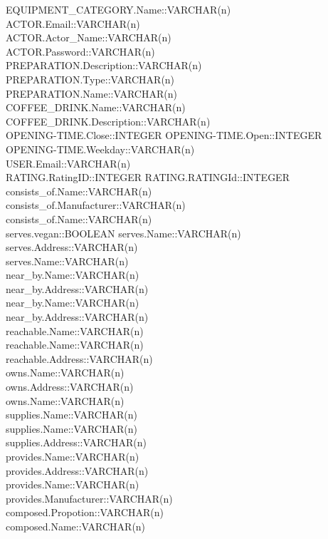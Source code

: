 EQUIPMENT\_CATEGORY.Name::VARCHAR(n)\\
ACTOR.Email::VARCHAR(n)\\
ACTOR.Actor\_Name::VARCHAR(n)\\
ACTOR.Password::VARCHAR(n)\\
PREPARATION.Description::VARCHAR(n)\\
PREPARATION.Type::VARCHAR(n)\\
PREPARATION.Name::VARCHAR(n)\\
COFFEE\_DRINK.Name::VARCHAR(n)\\
COFFEE\_DRINK.Description::VARCHAR(n)\\
OPENING-TIME.Close::INTEGER
OPENING-TIME.Open::INTEGER
OPENING-TIME.Weekday::VARCHAR(n)\\
USER.Email::VARCHAR(n)\\
RATING.RatingID::INTEGER
RATING.RATINGId::INTEGER
consists\_of.Name::VARCHAR(n)\\
consists\_of.Manufacturer::VARCHAR(n)\\
consists\_of.Name::VARCHAR(n)\\
serves.vegan::BOOLEAN
serves.Name::VARCHAR(n)\\
serves.Address::VARCHAR(n)\\
serves.Name::VARCHAR(n)\\
near\_by.Name::VARCHAR(n)\\
near\_by.Address::VARCHAR(n)\\
near\_by.Name::VARCHAR(n)\\
near\_by.Address::VARCHAR(n)\\
reachable.Name::VARCHAR(n)\\
reachable.Name::VARCHAR(n)\\
reachable.Address::VARCHAR(n)\\
owns.Name::VARCHAR(n)\\
owns.Address::VARCHAR(n)\\
owns.Name::VARCHAR(n)\\
supplies.Name::VARCHAR(n)\\
supplies.Name::VARCHAR(n)\\
supplies.Address::VARCHAR(n)\\
provides.Name::VARCHAR(n)\\
provides.Address::VARCHAR(n)\\
provides.Name::VARCHAR(n)\\
provides.Manufacturer::VARCHAR(n)\\
composed.Propotion::VARCHAR(n)\\
composed.Name::VARCHAR(n)\\
